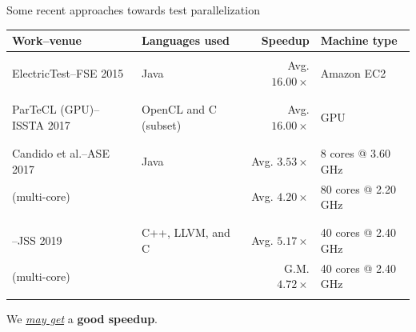 \documentclass{beamer}
\begin{document}
\begin{frame}{Some recent approaches towards test parallelization}
	\begin{center}
		\fontsize{7.5}{7.5}
		{	
			\selectfont
			\setlength{\tabcolsep}{0.9mm}
			\centering
			\begin{tabular}{l|l|r|l}
				\hline
				{\textbf{Work--venue}} & {\textbf{Languages used}} & {\textbf{Speedup}} & {\textbf{Machine type}}\\
				\hline
				{} & {} & {} & {}\\
				{{\rsm ElectricTest}--FSE 2015} & {\rsm Java} & {Avg. $16.00\times$} & {Amazon EC2}\\
				{} & {} & {} & {}\\
				\hline
				{} & {} & {} & {}\\
				{{\rsm ParTeCL} (GPU)--ISSTA 2017} & {OpenCL and {\rsm C (subset)}} & {Avg. $16.00\times$} & {GPU}\\
				{} & {} & {} & {}\\
				\hline
				{} & {} & {} & {}\\
				{Candido et al.--ASE 2017} & {\rsm Java} & {Avg. $3.53\times$} & {8 cores @ 3.60 GHz}\\
				{({\rsm multi-core})} & {} & {Avg. $4.20\times$} & {80 cores @ 2.20 GHz}\\
				{} & {} & {} & {}\\
				\hline
				{} & {} & {} & {}\\
				{\mahtab--JSS 2019} & {C++, LLVM, and {\rsm C}} & {Avg. $5.17\times$} & {40 cores @ 2.40 GHz}\\
				{({\rsm multi-core})} & {} & {G.M. $4.72\times$} & {40 cores @ 2.40 GHz}\\
				{} & {} & {} & {}\\
				\hline
			\end{tabular}
		}	
	\end{center}
	\centering
	{\fontsize{9}{9}\selectfont We \underline{\textit{may get}} a {\color{indiagreen}\textbf{good speedup}}.}
\end{frame}
\end{document}
